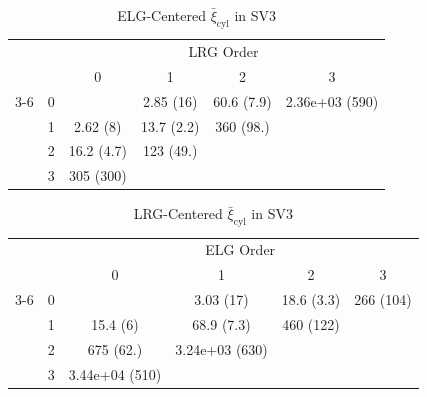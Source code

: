 \documentclass[fleqn,usenatbib]{mnras}
\begin{document}
    \begin{table}
    \caption{ELG-Centered $\bar{\xi}_{\text{cyl}}$ in SV3}
    \begin{tabular}{ c  c  c  c c c}
    \multicolumn{2}{c}{}&\multicolumn{4}{c}{LRG Order}\\
     \multicolumn{1}{c}{}& &  0&1&  2 &3\\ \cline{3-6}
    
    \multirow[|l|]{4}{*}{\rotatebox[origin=c]{90}{ELG Order}}& \multicolumn{1}{c|}{0} && 2.85 (16) & 60.6 (7.9)&2.36e+03 (590)\\
     & \multicolumn{1}{c|}{1} &2.62 (8)&13.7 (2.2)&360 (98.)&\multicolumn{1}{c}{}\\
    
     &\multicolumn{1}{c|}{2} & 16.2 (4.7)&123 (49.)& \multicolumn{2}{c}{}\\
     &\multicolumn{1}{c|}{3} &305 (300)& \multicolumn{2}{c}{}\\
    
    \end{tabular}
    
    \end{table}

    \begin{table}
    \caption{LRG-Centered $\bar{\xi}_{\text{cyl}}$ in SV3}
    \begin{tabular}{ c  c  c  c c c}
    \multicolumn{2}{c}{}&\multicolumn{4}{c}{ELG Order}\\
     \multicolumn{1}{c}{}& &  0&1&  2 &3\\ \cline{3-6}
    
    \multirow[|l|]{4}{*}{\rotatebox[origin=c]{90}{LRG Order}}& \multicolumn{1}{c|}{0} && 3.03 (17) & 18.6 (3.3)&266 (104)\\
     & \multicolumn{1}{c|}{1} &15.4 (6)&68.9 (7.3)&460 (122)&\multicolumn{1}{c}{}\\
    
     &\multicolumn{1}{c|}{2} & 675 (62.)&3.24e+03 (630)& \multicolumn{2}{c}{}\\
     &\multicolumn{1}{c|}{3} &3.44e+04 (510)& \multicolumn{2}{c}{}\\
    
    \end{tabular}
    
    \end{table}
\end{document}
